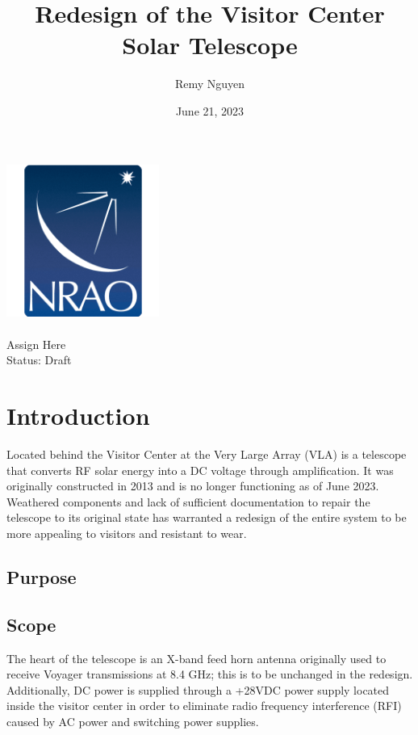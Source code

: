 \documentclass[titlepage]{article}
\title{Redesign of the Visitor Center Solar Telescope}
\author{Remy Nguyen
    }%
\date{June 21, 2023}
\def\docnum{Assign Here}
\def\status{Draft}
\begin{document}
\begin{titlepage}
\begin{center}
     \vspace*{1cm}
     \includegraphics[width=5cm]{images/NRAO Logo Badge.png} \\
     \vspace*{0.5cm}
     \textbf{\Huge\thetitle} \\
     \vspace*{0.5cm}
     \large\docnum \\
     \huge Status: \status
     
\end{center}
\end{titlepage}

\tableofcontents
\thispagestyle{fancy}
\newpage
        
\section{Introduction}
Located behind the Visitor Center at the Very Large Array (VLA) is a telescope that converts RF solar energy into a DC voltage through amplification. It was originally constructed in 2013 and is no longer functioning as of June 2023. Weathered components and lack of sufficient documentation to repair the telescope to its original state has warranted a redesign of the entire system to be more appealing to visitors and resistant to wear.

\subsection{Purpose}


\subsection{Scope}
The heart of the telescope is an X-band feed horn antenna originally used to receive Voyager transmissions at 8.4 GHz; this is to be unchanged in the redesign. Additionally, DC power is supplied through a +28VDC power supply located inside the visitor center in order to eliminate radio frequency interference (RFI) caused by AC power and switching power supplies.
\end{document}
